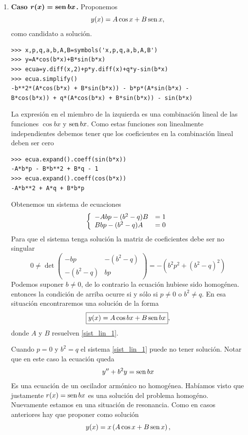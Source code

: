 \begin{enumerate}
\item \textbf{Caso $\b{r(x)=\sen bx}$.}
Proponemos
\[y(x)=A\cos x+ B\sen x,\]
como candidato a solución.
\begin{lstlisting}
>>> x,p,q,a,b,A,B=symbols('x,p,q,a,b,A,B')
>>> y=A*cos(b*x)+B*sin(b*x)
>>> ecua=y.diff(x,2)+p*y.diff(x)+q*y-sin(b*x)
>>> ecua.simplify()
-b**2*(A*cos(b*x) + B*sin(b*x)) - b*p*(A*sin(b*x) -
B*cos(b*x)) + q*(A*cos(b*x) + B*sin(b*x)) - sin(b*x)
\end{lstlisting}


La expresión en el miembro de la izquierda es una combinación lineal de las funciones $\cos bx$ y $\sen bx$. Como estas funciones son linealmente independientes
debemos tener que los coeficientes en la combinación lineal deben ser cero

\begin{lstlisting}
>>> ecua.expand().coeff(sin(b*x))
-A*b*p - B*b**2 + B*q - 1
>>> ecua.expand().coeff(cos(b*x))
-A*b**2 + A*q + B*b*p
\end{lstlisting}

Obtenemos un sistema de ecuaciones
\begin{equation}\label{sist_lin_1}
\left\{\begin{array}{l l}
-Abp - (b^2 - q)B & = 1\\
Bbp - (b^2 - q)A &=0
\end{array}
\right.
\end{equation}
%
Para que el sistema tenga solución la matriz de coeficientes debe ser no singular
\[
0\neq\det \begin{pmatrix}
-bp & -(b^2-q)\\
-(b^2-q) & bp
\end{pmatrix} = -(b^2p^2+(b^2-q)^2)
\]
Podemos suponer $b\neq 0$, de lo contrario la ecuación hubiese sido homogénea. entonces la condición de arriba ocurre si y sólo si
$p\neq 0$ o $b^2\neq q$. En esa situación encontraremos una solución de la forma
\[
\boxed{y(x)=A\cos bx + B\sen bx},
\]
donde $A$ y $B$ resuelven \eqref{sist_lin_1}.

\label{eq:forz_res}
Cuando $p=0$ y $b^2= q$ el sistema \eqref{sist_lin_1} puede no tener solución. Notar que en este caso la ecuación queda
\[
y''+b^2y=\sen bx
\]
Es una ecuación de un oscilador armónico no homogénea. Habíamos visto que justamente $r(x)=\sen bx$ es una solución del problema homogéno. Nuevamente
estamos en una situación de resonancia. Como en casos anteriores hay que proponer como solución
\[y(x)=x\left(A\cos x+ B\sen x\right),\]





\end{enumerate}
